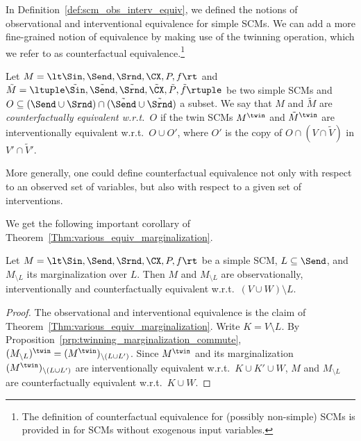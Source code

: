 In Definition~\ref{def:scm_obs_interv_equiv}, we defined the notions of observational and interventional equivalence for simple SCMs. 
We can add a more fine-grained notion of equivalence by making use of the twinning operation, which we refer to as counterfactual equivalence.\footnote{The definition of counterfactual equivalence for (possibly non-simple) SCMs is provided in \cite{BFPM21} for SCMs without exogenous input variables.}
\begin{Def}
  Let $M = \lt \Sin, \Send, \Srnd, \CX, P, f \rt$ and
  $\tilde{M} = \ltuple \tilde{\Sin}, \tilde{\Send}, \tilde{\Srnd}, \tilde{\CX}, \tilde{P}, \tilde{f} \rtuple$ be two simple SCMs
  and $O \subseteq (\Send \cup \Srnd) \cap (\tilde{\Send} \cup \tilde{\Srnd})$ a subset.
  We say that $M$ and $\tilde{M}$ are \emph{counterfactually equivalent w.r.t.\ $O$} if the twin SCMs $M^\twin$ and $\tilde{M}^\twin$ are interventionally equivalent w.r.t.\ $O \cup O'$, where
    $O'$ is the copy of $O \cap (V \cap \tilde{V})$ in $V' \cap \tilde{V}'$.
\end{Def}
More generally, one could define counterfactual equivalence not only with respect to an observed set of variables, but also with respect to a given set of interventions.

We get the following important corollary of Theorem~\ref{Thm:various_equiv_marginalization}.
\begin{Cor}\label{Cor:various_equiv_marginalization}
  Let $M = \lt \Sin, \Send, \Srnd, \CX, P, f \rt$ be a simple SCM, $L \subseteq \Send$, and
  $M_{\setminus L}$ its marginalization over $L$. Then $M$ and $M_{\setminus L}$ are observationally,
  interventionally and counterfactually equivalent w.r.t.\ $(V \cup W) \setminus L$.
\end{Cor}
\begin{proof}
  The observational and interventional equivalence is the claim of Theorem~\ref{Thm:various_equiv_marginalization}.
  Write $K = V \setminus L$.
  By Proposition~\ref{prp:twinning_marginalization_commute}, $(M_{\setminus L})^\twin = (M^\twin)_{\setminus (L \cup L')}$.
  Since $M^\twin$ and its marginalization $(M^\twin)_{\setminus (L \cup L')}$ are interventionally equivalent w.r.t.\ $K \cup K' \cup W$, $M$ and $M_{\setminus L}$ are counterfactually equivalent w.r.t.\ $K \cup W$.
\end{proof}

